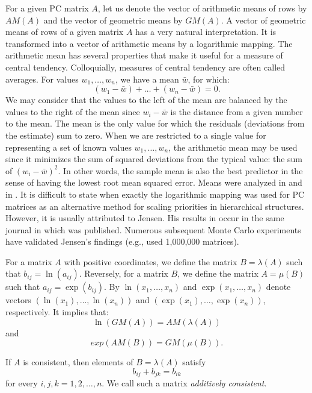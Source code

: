 \documentclass [12pt]{article}
\theoremstyle{definition}
\begin{document}
For a given PC matrix $A$, let us denote the vector of arithmetic means of rows by $AM(A)$ and the vector of geometric means by $GM(A)$. 
A vector of geometric means of rows of a given matrix $A$ has a very natural interpretation.
It is transformed into a vector of arithmetic means by a logarithmic mapping.
The arithmetic mean has several properties that make it useful for a measure of central tendency.
Colloquially, measures of central tendency are often called averages.
For values $w_1,\ldots,w_n$, 
we have a mean $\bar{w}$, for which: $$(w_1-\bar{w}) + \ldots + (w_n-\bar{w}) = 0.$$
We may consider that the values to the left of the mean are balanced by the values to the right of the mean since 
$w_i-\bar{w}$ is the distance from a given number to the mean. The mean is the only value for which the residuals 
(deviations from the estimate) sum to zero.
When we are restricted to a single value for representing a set of known values $w_1,\dotsc,w_n$, 
the arithmetic mean may be used since it minimizes the sum of squared deviations 
from the typical value: the sum of $(w_i-\bar{w})^2$. 
In other words, the sample mean is also the best predictor
in the sense of having the lowest root mean squared error. Means were analyzed in \cite{Aczel1948} and in \cite{AczelSaaty1983}. 
It is difficult to state when exactly the logarithmic mapping was used for PC matrices as an alternative method for scaling priorities in hierarchical structures. However, it is usually attributed to Jensen. His results in \cite{Jensen84} occur in the same journal in which \cite{Saaty77} was published. Numerous subsequent Monte Carlo experiments have validated Jensen's findings (e.g., \cite{HK1996} used 1,000,000 matrices). 

For a matrix $A$ with positive coordinates, we define the matrix $B=\lambda(A)$ such that $b_{ij}=\ln(a_{ij})$. 
Reversely, for a matrix $B$, we define the matrix $A=\mu(B)$ such that $a_{ij}=\exp(b_{ij})$. 
By $\ln(x_1,\ldots,x_n)$ and $\exp(x_1,\ldots,x_n)$ denote vectors $(\ln(x_1),\ldots,\ln(x_n))$ 
and $(\exp(x_1),\ldots,\exp(x_n))$, respectively. It implies that:
\begin{equation}\label{ln}
\ln(GM(A))=AM(\lambda(A))
\end{equation}  and 
\begin{equation}\label{exp}
exp(AM(B))=GM(\mu(B)).
\end{equation}

\noindent If $A$ is consistent, then elements of $B=\lambda(A)$ satisfy 
$$b_{ij} + b_{jk}=b_{ik}$$ for every $i,j,k=1,2, \ldots ,n$. We call such a matrix {\em additively consistent}.
\end{document}
